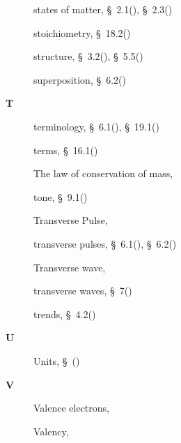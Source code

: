 \begin{multicols}{2}
{\begin{description}
	  \item[] \noindent\raggedright states of matter,  \S~2.1(\pageref{m38736}),  \S~2.3(\pageref{m38730})
	  
	  \item[] \noindent\raggedright stoichiometry,  \S~18.2(\pageref{m38712})
	  
	  \item[] \noindent\raggedright structure,  \S~3.2(\pageref{m38745}),  \S~5.5(\pageref{m38689})
	  
	  \item[] \noindent\raggedright superposition,  \S~6.2(\pageref{m38802})
	  \vspace{.3cm}
	  \item[{\large \bfseries T}]\noindent\raggedright
	  terminology,  \S~6.1(\pageref{m38801}),  \S~19.1(\pageref{m38812})
	  
	  \item[] \noindent\raggedright terms,  \S~16.1(\pageref{m38771})
	  
	  \item[] \noindent\raggedright The law of conservation of mass,  \pageref{id2463440}
	  
	  \item[] \noindent\raggedright tone,  \S~9.1(\pageref{m38799})
	  
	  \item[] \noindent\raggedright Transverse Pulse,  \pageref{id2434870}
	  
	  \item[] \noindent\raggedright transverse pulses,  \S~6.1(\pageref{m38801}),  \S~6.2(\pageref{m38802})
	  
	  \item[] \noindent\raggedright Transverse wave,  \pageref{id2438862}
	  
	  \item[] \noindent\raggedright transverse waves,  \S~7(\pageref{m38806})
	  
	  \item[] \noindent\raggedright trends,  \S~4.2(\pageref{m38757})
	  \vspace{.3cm}
	  \item[{\large \bfseries U}]\noindent\raggedright
	  Units,  \S~(\pageref{m30853})
	  \vspace{.3cm}
	  \item[{\large \bfseries V}]\noindent\raggedright
	  Valence electrons,  \pageref{id2421518}
	  
	  \item[] \noindent\raggedright Valency,  \pageref{id2427205}
	  

\end{description}}
\end{multicols}
